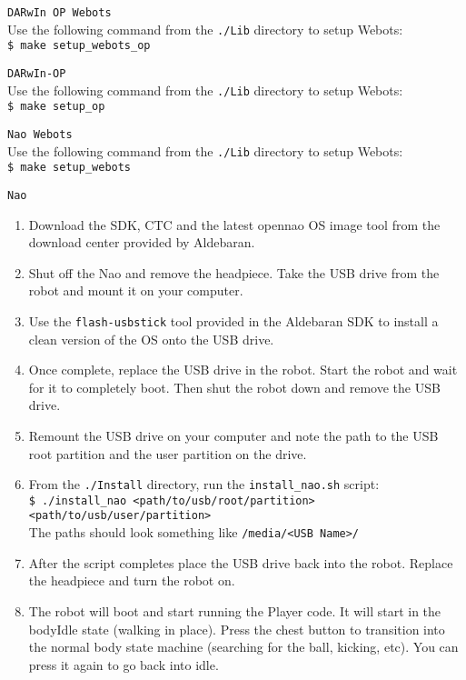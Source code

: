 \documentclass{article}
\begin{document}
  \begin{description}
  
      \item \texttt{DARwIn OP Webots} \\
      Use the following command from the \texttt{./Lib} directory to setup Webots: \\
      \texttt{\$ make setup\_webots\_op}
  
    \item \texttt{DARwIn-OP} \\
      Use the following command from the \texttt{./Lib} directory to setup Webots: \\
      \texttt{\$ make setup\_op}
      
            \item \texttt{Nao Webots} \\
      Use the following command from the \texttt{./Lib} directory to setup Webots: \\
      \texttt{\$ make setup\_webots}
      
      
    \item \texttt{Nao} \\
      \begin{enumerate}
        \item Download the SDK, CTC and the latest opennao OS image tool from the download center provided by Aldebaran.
        \item Shut off the Nao and remove the headpiece. Take the USB drive from the robot and mount it on your computer.
        \item Use the \texttt{flash-usbstick} tool provided in the Aldebaran SDK to install a clean version of the OS onto the USB drive.
        \item Once complete, replace the USB drive in the robot. Start the robot and wait for it to completely boot. Then shut the robot down and remove the USB drive.
        \item Remount the USB drive on your computer and note the path to the USB root partition and the user partition on the drive.
        \item From the \texttt{./Install} directory, run the \texttt{install\_nao.sh} script: \\
          \texttt{\$ ./install\_nao <path/to/usb/root/partition> <path/to/usb/user/partition>} \\
          The paths should look something like \texttt{/media/<USB Name>/}
        \item After the script completes place the USB drive back into the robot. Replace the headpiece and turn the robot on.
        \item The robot will boot and start running the Player code. It will start in the bodyIdle state (walking in place). Press the chest button to transition into the normal body state machine (searching for the ball, kicking, etc). You can press it again to go back into idle.
      \end{enumerate}
  \end{description}
\end{document}
